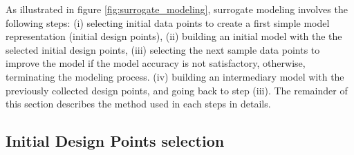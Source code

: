 
 

 
As illustrated in figure \ref{fig:surrogate_modeling},  surrogate modeling involves the following steps: (i) selecting initial data points to create a first simple model representation (initial design points), (ii) building an initial model with  the the selected initial design points, (iii) selecting the next sample data points to improve the  model if the model accuracy is not satisfactory, otherwise, terminating the modeling process. (iv) building an intermediary model with the previously collected design points, and going back to step (iii). The remainder of this section describes the method used in each steps in details.

 \subsection{Initial Design Points selection}


